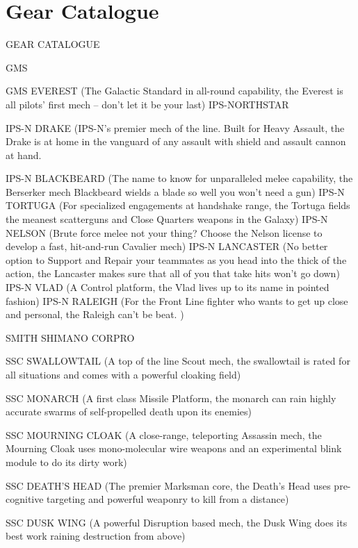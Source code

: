 \section{Gear Catalogue}
 GEAR CATALOGUE  

                                                GMS  

GMS EVEREST (The Galactic Standard in all-round capability, the Everest is all pilots’ first mech  
-- don’t let it be your last)  
                                    IPS-NORTHSTAR  

IPS-N DRAKE (IPS-N’s premier mech of the line. Built for Heavy Assault, the Drake is at home  
in the vanguard of any assault with shield and assault cannon at hand.
 
IPS-N BLACKBEARD (The name to know for unparalleled melee capability, the Berserker mech  
Blackbeard wields a blade so well you won’t need a gun)  
IPS-N TORTUGA (For specialized engagements at handshake range, the Tortuga fields the  
meanest scatterguns and Close Quarters weapons in the Galaxy)  
IPS-N NELSON (Brute force melee not your thing? Choose the Nelson license to develop a fast,  
hit-and-run Cavalier mech)  
IPS-N LANCASTER (No better option to Support and Repair your teammates as you head into  
the thick of the action, the Lancaster makes sure that all of you that take hits won’t go down)  
IPS-N VLAD (A Control platform, the Vlad lives up to its name in pointed fashion)  
IPS-N RALEIGH (For the Front Line fighter who wants to get up close and personal, the Raleigh  
can’t be beat. )  

                           SMITH SHIMANO CORPRO  

SSC SWALLOWTAIL (A top of the line Scout mech, the swallowtail is rated for all situations and  
comes with a powerful cloaking field)
 
SSC MONARCH (A first class Missile Platform, the monarch can rain highly accurate swarms of  
self-propelled death upon its enemies)
 
SSC MOURNING CLOAK (A close-range, teleporting Assassin mech, the Mourning Cloak uses  
mono-molecular wire weapons and an experimental blink module to do its dirty work)
 
SSC DEATH’S HEAD (The premier Marksman core, the Death’s Head uses pre-cognitive  
targeting and powerful weaponry to kill from a distance)
 
SSC DUSK WING (A powerful Disruption based mech, the Dusk Wing does its best work  
raining destruction from above)
 
